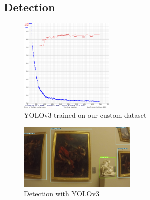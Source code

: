 \subsection{Detection}



\begin{figure}[h!]
    \centering
        \includegraphics[width=0.4\textwidth]{pictures/painting_detection/training-v3.png}
    \caption{YOLOv3 trained on our custom dataset}
    \label{fig:training-v3}
\end{figure}

\begin{figure}[h!]
    \centering
        \includegraphics[width=0.5\textwidth]{pictures/painting_detection/yolo-detection2.PNG}
    \caption{Detection with YOLOv3}
    \label{fig:yolo_detection}
\end{figure}


